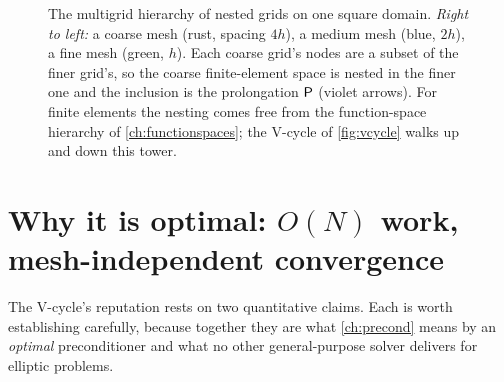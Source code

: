 \begin{figure}[t]
\centering
{}
\caption[The grid hierarchy]{The multigrid hierarchy of nested grids on one square domain.
\emph{Right to left:} a coarse mesh (rust, spacing $4h$), a medium mesh (blue, $2h$), a fine
mesh (green, $h$). Each coarse grid's nodes are a subset of the finer grid's, so the coarse
finite-element space is nested in the finer one and the inclusion is the prolongation
$\mathsf{P}$ (violet arrows). For finite elements the nesting comes free from the
function-space hierarchy of \cref{ch:functionspaces}; the V-cycle of \cref{fig:vcycle}
walks up and down this tower.}
\label{fig:hierarchy}
\end{figure}

\section{Why it is optimal: $O(N)$ work, mesh-independent convergence}
\label{sec:optimal}

The V-cycle's reputation rests on two quantitative claims. Each is worth establishing
carefully, because together they are what \cref{ch:precond} means by an \emph{optimal}
preconditioner and what no other general-purpose solver delivers for elliptic problems.

